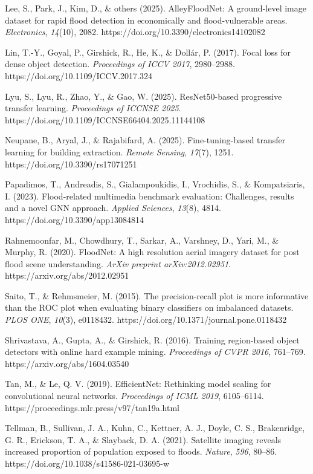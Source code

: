 \documentclass[
  11pt,
]{article}
\begin{document}
Lee, S., Park, J., Kim, D., \& others (2025). AlleyFloodNet: A
ground-level image dataset for rapid flood detection in economically and
flood-vulnerable areas. \emph{Electronics}, \emph{14}(10), 2082.
https://doi.org/10.3390/electronics14102082

Lin, T.-Y., Goyal, P., Girshick, R., He, K., \& Dollár, P. (2017). Focal
loss for dense object detection. \emph{Proceedings of ICCV 2017},
2980--2988. https://doi.org/10.1109/ICCV.2017.324

Lyu, S., Lyu, R., Zhao, Y., \& Gao, W. (2025). ResNet50-based
progressive transfer learning. \emph{Proceedings of ICCNSE 2025}.
https://doi.org/10.1109/ICCNSE66404.2025.11144108

Neupane, B., Aryal, J., \& Rajabifard, A. (2025). Fine-tuning-based
transfer learning for building extraction. \emph{Remote Sensing},
\emph{17}(7), 1251. https://doi.org/10.3390/rs17071251

Papadimos, T., Andreadis, S., Gialampoukidis, I., Vrochidis, S., \&
Kompatsiaris, I. (2023). Flood-related multimedia benchmark evaluation:
Challenges, results and a novel GNN approach. \emph{Applied Sciences},
\emph{13}(8), 4814. https://doi.org/10.3390/app13084814

Rahnemoonfar, M., Chowdhury, T., Sarkar, A., Varshney, D., Yari, M., \&
Murphy, R. (2020). FloodNet: A high resolution aerial imagery dataset
for post flood scene understanding. \emph{ArXiv preprint
arXiv:2012.02951}. https://arxiv.org/abs/2012.02951

Saito, T., \& Rehmsmeier, M. (2015). The precision-recall plot is more
informative than the ROC plot when evaluating binary classifiers on
imbalanced datasets. \emph{PLOS ONE}, \emph{10}(3), e0118432.
https://doi.org/10.1371/journal.pone.0118432

Shrivastava, A., Gupta, A., \& Girshick, R. (2016). Training
region-based object detectors with online hard example mining.
\emph{Proceedings of CVPR 2016}, 761--769.
https://arxiv.org/abs/1604.03540

Tan, M., \& Le, Q. V. (2019). EfficientNet: Rethinking model scaling for
convolutional neural networks. \emph{Proceedings of ICML 2019},
6105--6114. https://proceedings.mlr.press/v97/tan19a.html

Tellman, B., Sullivan, J. A., Kuhn, C., Kettner, A. J., Doyle, C. S.,
Brakenridge, G. R., Erickson, T. A., \& Slayback, D. A. (2021).
Satellite imaging reveals increased proportion of population exposed to
floods. \emph{Nature}, \emph{596}, 80--86.
https://doi.org/10.1038/s41586-021-03695-w
\end{document}
